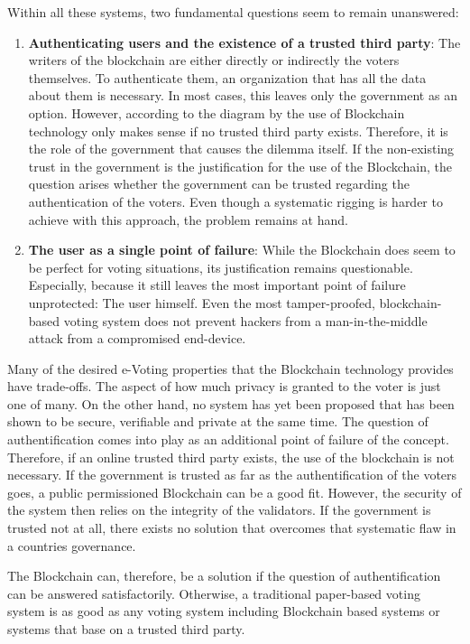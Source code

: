 Within all these systems, two fundamental questions seem to remain unanswered:
\begin{enumerate}
	\item \textbf{Authenticating users and the existence of a trusted third party}:    The writers of the blockchain are either directly or indirectly the voters themselves. To authenticate them, an organization that has all the data about them is necessary. In most cases, this leaves only the government as an option. However, according to the diagram by  \citeauthor{Wust2017} the use of Blockchain technology only makes sense if no trusted third party exists. Therefore, it is the role of the government that causes the dilemma itself. If the non-existing trust in the government is the justification for the use of the Blockchain, the question arises whether the government can be trusted regarding the authentication of the voters. Even though a systematic rigging is harder to achieve with this approach, the problem remains at hand.
	\item \textbf{The user as a single point of failure}: While the Blockchain does seem to be perfect for voting situations, its justification remains questionable. Especially, because it still leaves the most important point of failure unprotected: The user himself. Even the most tamper-proofed, blockchain-based voting system does not prevent hackers from a man-in-the-middle attack from a compromised end-device.
\end{enumerate}

Many of the desired e-Voting properties that the Blockchain technology provides have trade-offs. The aspect of how much privacy is granted to the voter is just one of many. On the other hand, no system has yet been proposed that has been shown to be secure, verifiable and private at the same time. The question of authentification comes into play as an additional point of failure of the concept.
Therefore, if an online trusted third party exists, the use of the blockchain is not necessary. If the government is trusted as far as the authentification of the voters goes, a public permissioned Blockchain can be a good fit. However, the security of the system then relies on the integrity of the validators.
If the government is trusted not at all, there exists no solution that overcomes that systematic flaw in a countries governance.

The Blockchain can, therefore, be a solution if the question of authentification can be answered satisfactorily. Otherwise, a traditional paper-based voting system is as good as any voting system including Blockchain based systems or systems that base on a trusted third party.

